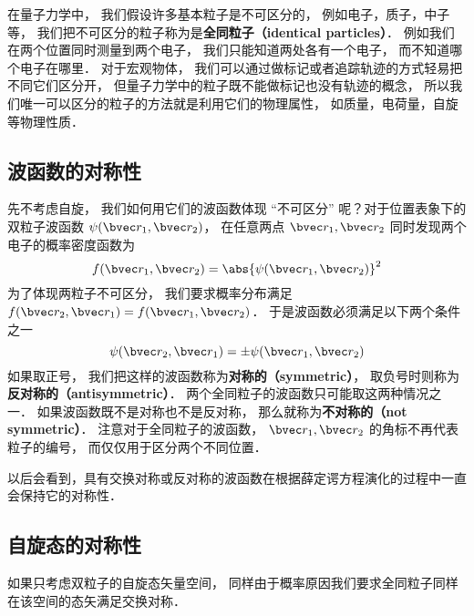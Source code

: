 
在量子力学中， 我们假设许多基本粒子是不可区分的， 例如电子，质子，中子等， 我们把不可区分的粒子称为是\textbf{全同粒子（identical particles）}． 例如我们在两个位置同时测量到两个电子， 我们只能知道两处各有一个电子， 而不知道哪个电子在哪里． 对于宏观物体， 我们可以通过做标记或者追踪轨迹的方式轻易把不同它们区分开， 但量子力学中的粒子既不能做标记也没有轨迹的概念， 所以我们唯一可以区分的粒子的方法就是利用它们的物理属性， 如质量，电荷量，自旋等物理性质．

\subsection{波函数的对称性}
先不考虑自旋， 我们如何用它们的波函数体现 “不可区分” 呢？对于位置表象下的双粒子波函数 $\psi(\bvec r_1, \bvec r_2)$， 在任意两点 $\bvec r_1, \bvec r_2$ 同时发现两个电子的概率密度函数为%
\begin{equation}
f(\bvec r_1, \bvec r_2) = \abs{\psi(\bvec r_1, \bvec r_2)}^2
\end{equation}
为了体现两粒子不可区分， 我们要求概率分布满足 $f(\bvec r_2, \bvec r_1) = f(\bvec r_1, \bvec r_2)$． 于是波函数必须满足以下两个条件之一
\begin{equation}\label{IdPar_eq5}
\psi(\bvec r_2, \bvec r_1) = \pm \psi(\bvec r_1, \bvec r_2)
\end{equation}
如果取正号， 我们把这样的波函数称为\textbf{对称的（symmetric）}， 取负号时则称为\textbf{反对称的（antisymmetric）}． 两个全同粒子的波函数只可能取这两种情况之一． 如果波函数既不是对称也不是反对称， 那么就称为\textbf{不对称的（not symmetric）}． 注意对于全同粒子的波函数， $\bvec r_1, \bvec r_2$ 的角标不再代表粒子的编号， 而仅仅用于区分两个不同位置．

以后会看到，具有交换对称或反对称的波函数在根据薛定谔方程演化的过程中一直会保持它的对称性． %

\subsection{自旋态的对称性}
如果只考虑双粒子的自旋态矢量空间， 同样由于概率原因我们要求全同粒子同样在该空间的态矢满足交换对称．

